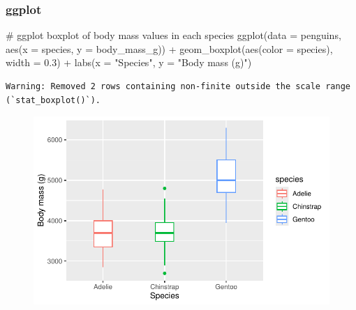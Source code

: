 \documentclass[
  letterpaper,
  DIV=11,
  numbers=noendperiod]{scrreprt}
\newenvironment{Shaded}{\begin{snugshade}}{\end{snugshade}}
\newcommand{\AttributeTok}[1]{\textcolor[rgb]{0.40,0.45,0.13}{#1}}
\newcommand{\CommentTok}[1]{\textcolor[rgb]{0.37,0.37,0.37}{#1}}
\newcommand{\FloatTok}[1]{\textcolor[rgb]{0.68,0.00,0.00}{#1}}
\newcommand{\FunctionTok}[1]{\textcolor[rgb]{0.28,0.35,0.67}{#1}}
\newcommand{\NormalTok}[1]{\textcolor[rgb]{0.00,0.23,0.31}{#1}}
\newcommand{\SpecialCharTok}[1]{\textcolor[rgb]{0.37,0.37,0.37}{#1}}
\newcommand{\StringTok}[1]{\textcolor[rgb]{0.13,0.47,0.30}{#1}}
\begin{document}
\begin{tcolorbox}[enhanced jigsaw, left=2mm, colframe=quarto-callout-tip-color-frame, leftrule=.75mm, opacitybacktitle=0.6, toptitle=1mm, title=\textcolor{quarto-callout-tip-color}{\faLightbulb}\hspace{0.5em}{Tip}, opacityback=0, coltitle=black, colbacktitle=quarto-callout-tip-color!10!white, breakable, colback=white, titlerule=0mm, bottomrule=.15mm, arc=.35mm, bottomtitle=1mm, rightrule=.15mm, toprule=.15mm]

\hypertarget{ggplot-5}{%
\subsubsection{ggplot}\label{ggplot-5}}

\begin{Shaded}
\begin{Highlighting}[]
\CommentTok{\# ggplot boxplot of body mass values in each species}
\FunctionTok{ggplot}\NormalTok{(}\AttributeTok{data =}\NormalTok{ penguins, }\FunctionTok{aes}\NormalTok{(}\AttributeTok{x =}\NormalTok{ species, }\AttributeTok{y =}\NormalTok{ body\_mass\_g)) }\SpecialCharTok{+}
  \FunctionTok{geom\_boxplot}\NormalTok{(}\FunctionTok{aes}\NormalTok{(}\AttributeTok{color =}\NormalTok{ species), }\AttributeTok{width =} \FloatTok{0.3}\NormalTok{) }\SpecialCharTok{+}
  \FunctionTok{labs}\NormalTok{(}\AttributeTok{x =} \StringTok{"Species"}\NormalTok{,}
       \AttributeTok{y =} \StringTok{"Body mass (g)"}\NormalTok{)}
\end{Highlighting}
\end{Shaded}

\begin{verbatim}
Warning: Removed 2 rows containing non-finite outside the scale range
(`stat_boxplot()`).
\end{verbatim}

\begin{figure}[H]

{\centering \includegraphics{scripts/02_dataViz/class4_files/figure-pdf/boxplot_ggplot-1.pdf}

}
\end{figure}
\end{tcolorbox}
\end{document}
